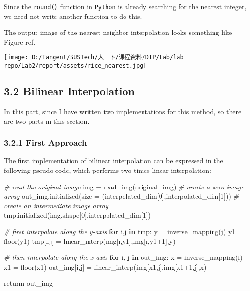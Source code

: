\documentclass[
]{article}
\newenvironment{Shaded}{}{}
\newcommand{\CommentTok}[1]{\textcolor[rgb]{0.38,0.63,0.69}{\textit{#1}}}
\newcommand{\ControlFlowTok}[1]{\textcolor[rgb]{0.00,0.44,0.13}{\textbf{#1}}}
\newcommand{\DecValTok}[1]{\textcolor[rgb]{0.25,0.63,0.44}{#1}}
\newcommand{\KeywordTok}[1]{\textcolor[rgb]{0.00,0.44,0.13}{\textbf{#1}}}
\newcommand{\NormalTok}[1]{#1}
\newcommand{\OperatorTok}[1]{\textcolor[rgb]{0.40,0.40,0.40}{#1}}
\begin{document}
Since the \texttt{round()} function in \texttt{Python} is already
searching for the nearest integer, we need not write another function to
do this.

The output image of the nearest neighbor interpolation looks something
like Figure ref.

\texttt{[image: D:/Tangent/SUSTech/大三下/课程资料/DIP/Lab/lab repo/Lab2/report/assets/rice\_nearest.jpg]}

\hypertarget{32-bilinear-interpolation}{%
\subsection{3.2 Bilinear
Interpolation}\label{32-bilinear-interpolation}}

In this part, since I have written two implementations for this method,
so there are two parts in this section.

\hypertarget{321-first-approach}{%
\subsubsection{3.2.1 First Approach}\label{321-first-approach}}

The first implementation of bilinear interpolation can be expressed in
the following pseudo-code, which performs two times linear
interpolation:

\begin{Shaded}
\begin{Highlighting}[]
\CommentTok{\# read the original image}
\NormalTok{img }\OperatorTok{=}\NormalTok{ read\_img(original\_img)}
\CommentTok{\# create a zero image array}
\NormalTok{out\_img.initialized(size }\OperatorTok{=}\NormalTok{ (interpolated\_dim[}\DecValTok{0}\NormalTok{],interpolated\_dim[}\DecValTok{1}\NormalTok{]))}
\CommentTok{\# create an intermediate image array}
\NormalTok{tmp.initialized(img.shape[}\DecValTok{0}\NormalTok{],interpolated\_dim[}\DecValTok{1}\NormalTok{])}

\CommentTok{\# first interpolate along the y{-}axis}
\ControlFlowTok{for}\NormalTok{ i,j }\KeywordTok{in}\NormalTok{ tmp:}
\NormalTok{    y }\OperatorTok{=}\NormalTok{ inverse\_mapping(j)}
\NormalTok{    y1 }\OperatorTok{=}\NormalTok{ floor(y1)}
\NormalTok{    tmp[i,j] }\OperatorTok{=}\NormalTok{ linear\_interp(img[i,y1],img[i,y1}\OperatorTok{+}\DecValTok{1}\NormalTok{],y)}

\CommentTok{\# then interpolate along the x{-}axis}
\ControlFlowTok{for}\NormalTok{ i, j }\KeywordTok{in}\NormalTok{ out\_img:}
\NormalTok{    x }\OperatorTok{=}\NormalTok{ inverse\_mapping(i)}
\NormalTok{    x1 }\OperatorTok{=}\NormalTok{ floor(x1)}
\NormalTok{    out\_img[i,j] }\OperatorTok{=}\NormalTok{ linear\_interp(img[x1,j],img[x1}\OperatorTok{+}\DecValTok{1}\NormalTok{,j],x)}

\NormalTok{returm out\_img}
\end{Highlighting}
\end{Shaded}
\end{document}
